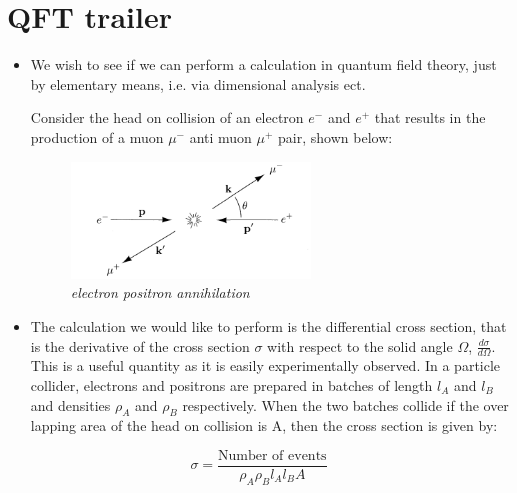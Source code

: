 \documentclass[11pt]{article}
\numberwithin{equation}{section}
\begin{document}
\section{QFT trailer}
\begin{itemize}
  \item We wish to see if we can perform a calculation in quantum field theory, just by elementary means, i.e. via dimensional analysis ect.

  Consider the head on collision of an electron $e^{-}$ and $e^{+}$ that results in the production of a muon $\mu^{-}$ anti muon $\mu^{+}$ pair, shown below: 
\begin{figure}[H]
\centering
\includegraphics[width=0.6\textwidth]{trailer.png}
\caption{\label{trailer}\emph{electron positron annihilation}}
\end{figure}


\item The calculation we would like to perform is the differential cross section, that is the derivative of the cross section $\sigma$ with respect to the solid angle $\Omega$, $\frac{d \sigma}{d \Omega}$. This is a useful quantity as it is easily experimentally observed. In a particle collider, electrons and positrons are prepared in batches of length $l_A$ and $l_B$ and densities $\rho_A$ and $\rho_B$ respectively. When the two batches collide if the over lapping area of the head on collision is A, then the cross section is given by:
\end{itemize}

\begin{equation*}
  \sigma = \frac{\text{Number of events}}{\rho_A\rho_B l_A l_B A}
\end{equation*}
\end{document}
